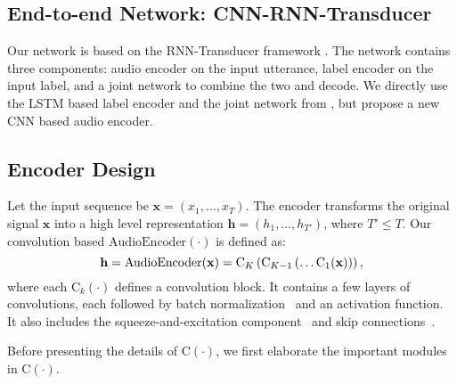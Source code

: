 \documentclass[a4paper]{article}
\begin{document}
\subsection{End-to-end Network: CNN-RNN-Transducer}
\label{sec:model:transducer}
\vspace{-0.02in}
Our network is based on the RNN-Transducer framework \cite{graves2012sequence, rao2017exploring, he2019}. The network contains three components: audio encoder on the input utterance, label encoder on the input label, and a joint network to combine the two and decode. We directly use the LSTM based label encoder and the joint network from \cite{he2019}, but propose a new CNN based audio encoder. 
\vspace{-0.05in}
\subsection{Encoder Design}
\vspace{-0.05in}
\label{sec:model:encoder}
Let the input sequence be $\mathbf{x}=(x_1, \ldots, x_T)$. The encoder transforms the original signal $\mathbf{x}$ into a high level representation $\mathbf{h}=(h_1, \ldots, h_{T'})$, where $T'\leq T$. Our convolution based $\mathrm{AudioEncoder}(\cdot)$ is defined as:
\begin{equation}
\begin{small}
    \mathbf{h} = \mathrm{AudioEncoder}(\mathbf{x}) = \mathrm{C}_K\left(\mathrm{C}_{K-1}\left(\ldots \mathrm{C}_{1}(\mathbf{x})\right)\right),
\label{eqn:encoder}
\end{small}
\end{equation}
where each $\mathrm{C}_k(\cdot)$ defines a convolution block. It contains a few layers of convolutions, each followed by batch normalization~\cite{goodfellow2016deep} and an activation function. It also includes the squeeze-and-excitation component~\cite{hu2018squeeze} and skip connections~\cite{he2016deep}. 

Before presenting the details of $\mathrm{C}(\cdot)$, we first elaborate the important modules in $\mathrm{C}(\cdot)$.

\vspace{-0.05in}
\end{document}
